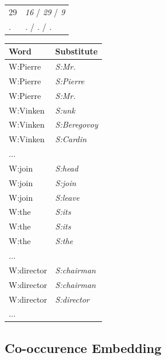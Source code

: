 \begin{table}[ht]
\begin{tabular}{|ll|}
29 & \textit{16} /  \textit{29} / \textit{9}\\
. & \textit{.}  / \textit{.} / \textit{.}\\
\hline
\end{tabular}
\quad
\begin{tabular}{|ll|}
\hline
\textbf{Word} & \textbf{Substitute}\\
\hline
W:Pierre & \textit{S:Mr.}\\
W:Pierre & \textit{S:Pierre}\\
W:Pierre & \textit{S:Mr.}\\
W:Vinken & \textit{S:unk}\\
W:Vinken & \textit{S:Beregovoy}\\
W:Vinken & \textit{S:Cardin}\\
$\hdots$&\\
W:join & \textit{S:head}\\
W:join & \textit{S:join}\\
W:join & \textit{S:leave}\\
W:the & \textit{S:its}\\
W:the & \textit{S:its}\\
W:the & \textit{S:the}\\
$\hdots$&\\
W:director & \textit{S:chairman}\\
W:director & \textit{S:chairman}\\
W:director & \textit{S:director}\\
$\hdots$&\\
\hline
\end{tabular}
\label{tab:samples}
\end{table}

\subsection{Co-occurence Embedding}

